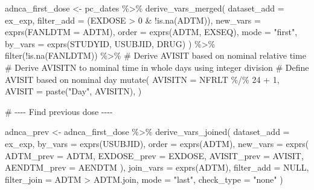 \documentclass[
  letterpaper,
  DIV=11,
  numbers=noendperiod]{scrreprt}
\newenvironment{Shaded}{\begin{snugshade}}{\end{snugshade}}
\newcommand{\AttributeTok}[1]{\textcolor[rgb]{0.40,0.45,0.13}{#1}}
\newcommand{\CommentTok}[1]{\textcolor[rgb]{0.37,0.37,0.37}{#1}}
\newcommand{\ConstantTok}[1]{\textcolor[rgb]{0.56,0.35,0.01}{#1}}
\newcommand{\DecValTok}[1]{\textcolor[rgb]{0.68,0.00,0.00}{#1}}
\newcommand{\FunctionTok}[1]{\textcolor[rgb]{0.28,0.35,0.67}{#1}}
\newcommand{\NormalTok}[1]{\textcolor[rgb]{0.00,0.23,0.31}{#1}}
\newcommand{\OtherTok}[1]{\textcolor[rgb]{0.00,0.23,0.31}{#1}}
\newcommand{\SpecialCharTok}[1]{\textcolor[rgb]{0.37,0.37,0.37}{#1}}
\newcommand{\StringTok}[1]{\textcolor[rgb]{0.13,0.47,0.30}{#1}}
\begin{document}
\begin{Shaded}
\begin{Highlighting}[]
\NormalTok{adnca\_first\_dose }\OtherTok{\textless{}{-}}\NormalTok{ pc\_dates }\SpecialCharTok{\%\textgreater{}\%}
  \FunctionTok{derive\_vars\_merged}\NormalTok{(}
    \AttributeTok{dataset\_add =}\NormalTok{ ex\_exp,}
    \AttributeTok{filter\_add =}\NormalTok{ (EXDOSE }\SpecialCharTok{\textgreater{}} \DecValTok{0} \SpecialCharTok{\&} \SpecialCharTok{!}\FunctionTok{is.na}\NormalTok{(ADTM)),}
    \AttributeTok{new\_vars =} \FunctionTok{exprs}\NormalTok{(}\AttributeTok{FANLDTM =}\NormalTok{ ADTM),}
    \AttributeTok{order =} \FunctionTok{exprs}\NormalTok{(ADTM, EXSEQ),}
    \AttributeTok{mode =} \StringTok{"first"}\NormalTok{,}
    \AttributeTok{by\_vars =} \FunctionTok{exprs}\NormalTok{(STUDYID, USUBJID, DRUG)}
\NormalTok{  ) }\SpecialCharTok{\%\textgreater{}\%}
  \FunctionTok{filter}\NormalTok{(}\SpecialCharTok{!}\FunctionTok{is.na}\NormalTok{(FANLDTM)) }\SpecialCharTok{\%\textgreater{}\%}
  \CommentTok{\# Derive AVISIT based on nominal relative time}
  \CommentTok{\# Derive AVISITN to nominal time in whole days using integer division}
  \CommentTok{\# Define AVISIT based on nominal day}
  \FunctionTok{mutate}\NormalTok{(}
    \AttributeTok{AVISITN =}\NormalTok{ NFRLT }\SpecialCharTok{\%/\%} \DecValTok{24} \SpecialCharTok{+} \DecValTok{1}\NormalTok{,}
    \AttributeTok{AVISIT =} \FunctionTok{paste}\NormalTok{(}\StringTok{"Day"}\NormalTok{, AVISITN),}
\NormalTok{  )}

\CommentTok{\# {-}{-}{-}{-} Find previous dose  {-}{-}{-}{-}}

\NormalTok{adnca\_prev }\OtherTok{\textless{}{-}}\NormalTok{ adnca\_first\_dose }\SpecialCharTok{\%\textgreater{}\%}
  \FunctionTok{derive\_vars\_joined}\NormalTok{(}
    \AttributeTok{dataset\_add =}\NormalTok{ ex\_exp,}
    \AttributeTok{by\_vars =} \FunctionTok{exprs}\NormalTok{(USUBJID),}
    \AttributeTok{order =} \FunctionTok{exprs}\NormalTok{(ADTM),}
    \AttributeTok{new\_vars =} \FunctionTok{exprs}\NormalTok{(}
      \AttributeTok{ADTM\_prev =}\NormalTok{ ADTM, }
      \AttributeTok{EXDOSE\_prev =}\NormalTok{ EXDOSE, }
      \AttributeTok{AVISIT\_prev =}\NormalTok{ AVISIT,}
      \AttributeTok{AENDTM\_prev =}\NormalTok{ AENDTM}
\NormalTok{    ),}
    \AttributeTok{join\_vars =} \FunctionTok{exprs}\NormalTok{(ADTM),}
    \AttributeTok{filter\_add =} \ConstantTok{NULL}\NormalTok{,}
    \AttributeTok{filter\_join =}\NormalTok{ ADTM }\SpecialCharTok{\textgreater{}}\NormalTok{ ADTM.join,}
    \AttributeTok{mode =} \StringTok{"last"}\NormalTok{,}
    \AttributeTok{check\_type =} \StringTok{"none"}
\NormalTok{  )}


\end{Highlighting}
\end{Shaded}
\end{document}
